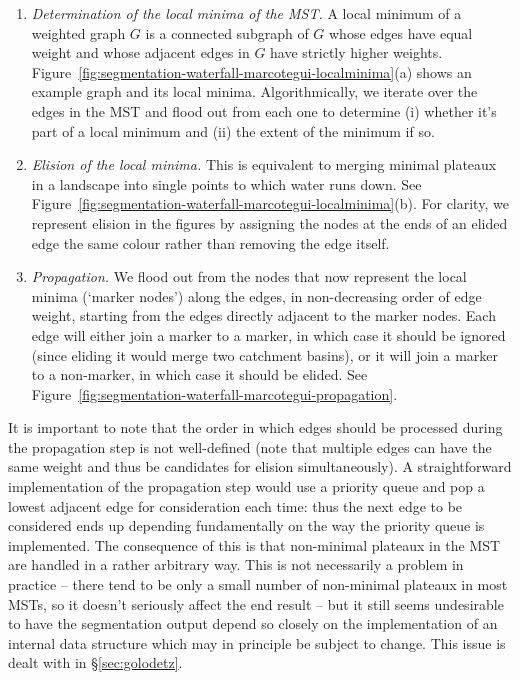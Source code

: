 \documentclass[preprint,a4paper]{elsarticle}
\begin{document}
\begin{enumerate}

\item \emph{Determination of the local minima of the MST.} A local minimum of a weighted graph $G$ is a connected subgraph of $G$ whose edges have equal weight and whose adjacent edges in $G$ have strictly higher weights. Figure~\ref{fig:segmentation-waterfall-marcotegui-localminima}(a) shows an example graph and its local minima. Algorithmically, we iterate over the edges in the MST and flood out from each one to determine (i) whether it's part of a local minimum and (ii) the extent of the minimum if so.

\item \emph{Elision of the local minima.} This is equivalent to merging minimal plateaux in a landscape into single points to which water runs down. See Figure~\ref{fig:segmentation-waterfall-marcotegui-localminima}(b). For clarity, we represent elision in the figures by assigning the nodes at the ends of an elided edge the same colour rather than removing the edge itself.

\item \emph{Propagation.} We flood out from the nodes that now represent the local minima (`marker nodes') along the edges, in non-decreasing order of edge weight, starting from the edges directly adjacent to the marker nodes. Each edge will either join a marker to a marker, in which case it should be ignored (since eliding it would merge two catchment basins), or it will join a marker to a non-marker, in which case it should be elided. See Figure~\ref{fig:segmentation-waterfall-marcotegui-propagation}.

\end{enumerate}

\noindent It is important to note that the order in which edges should be processed during the propagation step is not well-defined (note that multiple edges can have the same weight and thus be candidates for elision simultaneously). A straightforward implementation of the propagation step would use a priority queue and pop a lowest adjacent edge for consideration each time: thus the next edge to be considered ends up depending fundamentally on the way the priority queue is implemented. The consequence of this is that non-minimal plateaux in the MST are handled in a rather arbitrary way. This is not necessarily a problem in practice -- there tend to be only a small number of non-minimal plateaux in most MSTs, so it doesn't seriously affect the end result -- but it still seems undesirable to have the segmentation output depend so closely on the implementation of an internal data structure which may in principle be subject to change. This issue is dealt with in \S\ref{sec:golodetz}.
\end{document}
